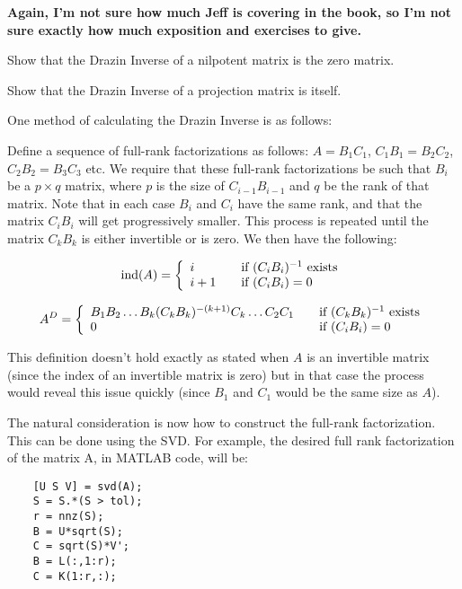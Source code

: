 {\bf Again, I'm not sure how much Jeff is covering in the book, so I'm not sure exactly how much exposition and exercises to give.}
\begin{problem}
Show that the Drazin Inverse of a nilpotent matrix is the zero matrix.
\end{problem}

\begin{problem}
Show that the Drazin Inverse of a projection matrix is itself.
\end{problem}


One method of calculating the Drazin Inverse is as follows:

Define a sequence of full-rank factorizations as follows: $A = B_1 C_1$, $C_1 B_1 = B_2 C_2$, $C_2 B_2 = B_3 C_3$ etc. We require that these full-rank factorizations be such that $B_i$ be a $p \times q$ matrix, where $p$ is the size of $C_{i-1} B_{i-1}$ and $q$ be the rank of that matrix. Note that in each case $B_i$ and $C_i$ have the same rank, and that the matrix $C_i B_i$ will get progressively smaller. This process is repeated until the matrix $C_k B_k$ is either invertible or is zero. We then have the following:

\[
\text{ind}(A) = \left\{
\begin{array} {l l}
i & \quad \text{if  $(C_i B_i)^{-1}$ exists}\\
i+1 & \quad \text {if  $(C_i B_i) = 0$}\\
\end{array} \right.
\]

\[
A^D = \left\{
\begin{array} {l l}
B_1 B_2 \ldots B_k (C_k B_k)^{-(k+1)} C_k \ldots C_2 C_1 & \quad \text{if } (C_k B_k)^{-1} \text{ exists}\\
0 & \quad \text {if } (C_i B_i) = 0 \\
\end{array} \right.
\]

This definition doesn't hold exactly as stated when $A$ is an invertible matrix (since the index of an invertible matrix is zero) but in that case the process would reveal this issue quickly (since $B_1$ and $C_1$ would be the same size as $A$).

The natural consideration is now how to construct the full-rank factorization. This can be done using the SVD. For example, the desired full rank factorization of the matrix A, in MATLAB code, will be:

\begin{verbatim}
    [U S V] = svd(A);
    S = S.*(S > tol);
    r = nnz(S);
    B = U*sqrt(S);
    C = sqrt(S)*V';
    B = L(:,1:r);
    C = K(1:r,:);
\end{verbatim}

